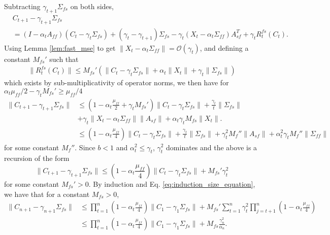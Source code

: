 Subtracting $\gamma_{t+1} \Sigma_{fs}$ on both sides, 
\begin{align*}
    &C_{t+1} - \gamma_{t+1} \Sigma_{fs}
    \\ &=
    (I - \alpha_t A_{ff}) (C_t - \gamma_t \Sigma_{fs}) + (\gamma_t - \gamma_{t+1}) \Sigma_{fs}
    - \gamma_t (X_t - \alpha_t \Sigma_{ff} )A_{sf}^T + \gamma_t R_t^{fs} (C_t) .
\end{align*}
Using Lemma \ref{lem:fast_mse} to get $\lVert X_t - \alpha_t \Sigma_{ff}\rVert = \mathcal{O}(\gamma_t)$, and defining a constant $M_{fs}'$ such that
\begin{align*}
    \lVert R_t^{fs} (C_t) \rVert \leq M_{fs}' 
    \left(\lVert C_t - \gamma_t \Sigma_{fs} \rVert + \alpha_t \lVert X_t \rVert + \gamma_t \lVert \Sigma_{fs} \rVert \right)
\end{align*}
which exists by sub-multiplicativity of operator norms, we then have for $\alpha_t \mu_{ff}/2 - \gamma_t M_{fs}' \geq \mu_{ff}/4$
\begin{align*}
    \lVert C_{t+1} - \gamma_{t+1} \Sigma_{fs}\rVert 
    &\leq 
    \left(1 - \alpha_t \frac{\mu_{ff}}{2} + \gamma_t M_{fs}'\right) \lVert C_t - \gamma_t \Sigma_{fs} \rVert
    + \frac{\gamma_t}{t} \lVert \Sigma_{fs} \rVert 
    \\ & + \gamma_t \lVert X_t - \alpha_t \Sigma_{ff}\rVert \lVert A_{sf}\rVert + \alpha_t \gamma_t M_{fs} \lVert X_t \rVert.
    \\ &    
    \leq \left(1 - \alpha_t \frac{\mu_{ff}}{4}\right) \lVert C_t - \gamma_t \Sigma_{fs}\rVert 
    + \frac{\gamma_t}{t} \lVert \Sigma_{fs} \rVert 
    + \gamma_t^2 M_f'' \lVert A_{sf}\rVert + \alpha_t^2 \gamma_t M_f'' \lVert \Sigma_{ff}\rVert 
\end{align*}
for some constant $M_f''$.
Since $b < 1$ and $\alpha_t^2 \leq \gamma_t$, $\gamma_t^2$ dominates and the above is a recursion of the form
\begin{equation}
    \lVert C_{t+1} - \gamma_{t+1} \Sigma_{fs} \rVert 
    \leq \left(1 - \alpha_t \frac{\mu_{ff}}{4}\right) \lVert C_t - \gamma_t \Sigma_{fs} \rVert + M_{fs}' \gamma_t^2
\end{equation}
for some constant $M_{fs}' > 0$. 
By induction and Eq. \eqref{eq:induction_size_equation}, we have that for a constant $M_{fs} > 0$,
\begin{align*}
    \lVert C_{n+1} - \gamma_{n+1} \Sigma_{fs} \rVert 
    & \leq 
    \prod_{t=1}^n \left(1 - \alpha_t \frac{\mu_{ff}}{4}\right) \lVert C_1 - \gamma_1 \Sigma_{fs} \rVert 
        + M_{fs}' \sum_{t=1}^n \gamma_t^2 \prod_{j=t+1}^n \left(1 - \alpha_t \frac{\mu_{ff}}{4}\right) 
    \\
    &\leq 
    \prod_{t=1}^n \left(1 - \alpha_t \frac{\mu_{ff}}{4}\right) \lVert C_1 - \gamma_1 \Sigma_{fs} \rVert 
    + M_{fs} \frac{\gamma_{n}^2}{\alpha_n} .
\end{align*}


